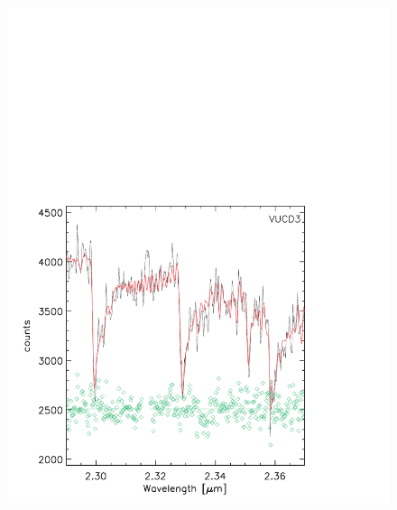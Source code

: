 \documentclass{aastex}
\begin{document}
\begin{figure}[ht!]
  \centering
  \begin{minipage}{0.48\textwidth}
    \includegraphics[trim={0 0 0 10cm},clip,scale=0.5]{vucd3_intfit.pdf}%
  \end{minipage}
  \begin{minipage}{0.48\textwidth}

\end{minipage}
\end{figure}
\end{document}
